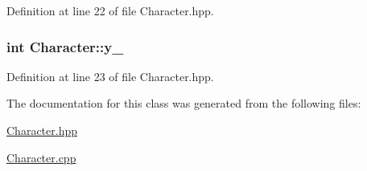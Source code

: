 Definition at line 22 of file Character.\-hpp.

\hypertarget{class_character_aeda4757626cbc50f408dc93eb541a831}{
\subsubsection[{y\-\_\-}]{\setlength{\rightskip}{0pt plus 5cm}int Character\-::y\-\_\-\hspace{0.3cm}{\ttfamily [protected]}}}\label{class_character_aeda4757626cbc50f408dc93eb541a831}


Definition at line 23 of file Character.\-hpp.



The documentation for this class was generated from the following files\-:\begin{DoxyCompactItemize}
\item 
\hyperlink{_character_8hpp}{Character.\-hpp}\item 
\hyperlink{_character_8cpp}{Character.\-cpp}\end{DoxyCompactItemize}
